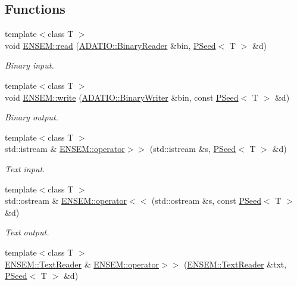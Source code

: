 \subsection*{Functions}
\begin{DoxyCompactItemize}
\item 
{\footnotesize template$<$class T $>$ }\\void \mbox{\hyperlink{group__primseed_ga89a527bfdc043ff49f07e44a2fbb7a90}{E\+N\+S\+E\+M\+::read}} (\mbox{\hyperlink{classADATIO_1_1BinaryReader}{A\+D\+A\+T\+I\+O\+::\+Binary\+Reader}} \&bin, \mbox{\hyperlink{classENSEM_1_1PSeed}{P\+Seed}}$<$ T $>$ \&d)
\begin{DoxyCompactList}\small\item\em Binary input. \end{DoxyCompactList}\item 
{\footnotesize template$<$class T $>$ }\\void \mbox{\hyperlink{group__primseed_gab778cd144e6a01cdbab68adedc21d456}{E\+N\+S\+E\+M\+::write}} (\mbox{\hyperlink{classADATIO_1_1BinaryWriter}{A\+D\+A\+T\+I\+O\+::\+Binary\+Writer}} \&bin, const \mbox{\hyperlink{classENSEM_1_1PSeed}{P\+Seed}}$<$ T $>$ \&d)
\begin{DoxyCompactList}\small\item\em Binary output. \end{DoxyCompactList}\item 
{\footnotesize template$<$class T $>$ }\\std\+::istream \& \mbox{\hyperlink{group__primseed_gaab9d3da69048030afda4583bcd687578}{E\+N\+S\+E\+M\+::operator$>$$>$}} (std\+::istream \&s, \mbox{\hyperlink{classENSEM_1_1PSeed}{P\+Seed}}$<$ T $>$ \&d)
\begin{DoxyCompactList}\small\item\em Text input. \end{DoxyCompactList}\item 
{\footnotesize template$<$class T $>$ }\\std\+::ostream \& \mbox{\hyperlink{group__primseed_ga63a0cabc9de5d7af797139dcbe08c7eb}{E\+N\+S\+E\+M\+::operator$<$$<$}} (std\+::ostream \&s, const \mbox{\hyperlink{classENSEM_1_1PSeed}{P\+Seed}}$<$ T $>$ \&d)
\begin{DoxyCompactList}\small\item\em Text output. \end{DoxyCompactList}\item 
{\footnotesize template$<$class T $>$ }\\\mbox{\hyperlink{classENSEM_1_1TextReader}{E\+N\+S\+E\+M\+::\+Text\+Reader}} \& \mbox{\hyperlink{group__primseed_ga1ab70381c53bf81dbfeced414a44a1d5}{E\+N\+S\+E\+M\+::operator$>$$>$}} (\mbox{\hyperlink{classENSEM_1_1TextReader}{E\+N\+S\+E\+M\+::\+Text\+Reader}} \&txt, \mbox{\hyperlink{classENSEM_1_1PSeed}{P\+Seed}}$<$ T $>$ \&d)

\end{DoxyCompactItemize}
